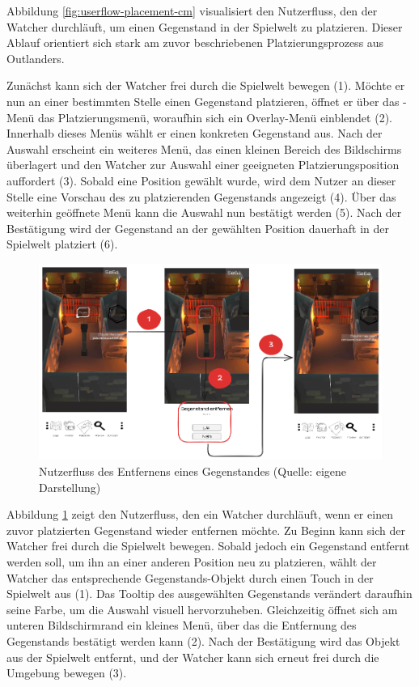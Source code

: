 Abbildung \ref{fig:userflow-placement-cm} visualisiert den Nutzerfluss, den der Watcher durchläuft, um einen Gegenstand in der Spielwelt zu platzieren. Dieser Ablauf orientiert sich stark am zuvor beschriebenen Platzierungsprozess aus Outlanders.

Zunächst kann sich der Watcher frei durch die Spielwelt bewegen (1). Möchte er nun an einer bestimmten Stelle einen Gegenstand platzieren, öffnet er über das -Menü das Platzierungsmenü, woraufhin sich ein Overlay-Menü einblendet (2). Innerhalb dieses Menüs wählt er einen konkreten Gegenstand aus. Nach der Auswahl erscheint ein weiteres Menü, das einen kleinen Bereich des Bildschirms überlagert und den Watcher zur Auswahl einer geeigneten Platzierungsposition auffordert (3). Sobald eine Position gewählt wurde, wird dem Nutzer an dieser Stelle eine Vorschau des zu platzierenden Gegenstands angezeigt (4). Über das weiterhin geöffnete Menü kann die Auswahl nun bestätigt werden (5). Nach der Bestätigung wird der Gegenstand an der gewählten Position dauerhaft in der Spielwelt platziert (6).

\begin{figure}[ht]
\centering
\includegraphics[width=1\linewidth]{content/pictures/RemovePlacementFlow.png}
\caption{Nutzerfluss des Entfernens eines Gegenstandes (Quelle: eigene Darstellung)}
\label{fig:userflow-removement-cm}
\end{figure}

Abbildung \ref{fig:userflow-removement-cm} zeigt den Nutzerfluss, den ein Watcher durchläuft, wenn er einen zuvor platzierten Gegenstand wieder entfernen möchte. Zu Beginn kann sich der Watcher frei durch die Spielwelt bewegen. Sobald jedoch ein Gegenstand entfernt werden soll, um ihn an einer anderen Position neu zu platzieren, wählt der Watcher das entsprechende Gegenstands-Objekt durch einen Touch in der Spielwelt aus (1). Das Tooltip des ausgewählten Gegenstands verändert daraufhin seine Farbe, um die Auswahl visuell hervorzuheben. Gleichzeitig öffnet sich am unteren Bildschirmrand ein kleines Menü, über das die Entfernung des Gegenstands bestätigt werden kann (2). Nach der Bestätigung wird das Objekt aus der Spielwelt entfernt, und der Watcher kann sich erneut frei durch die Umgebung bewegen (3).

